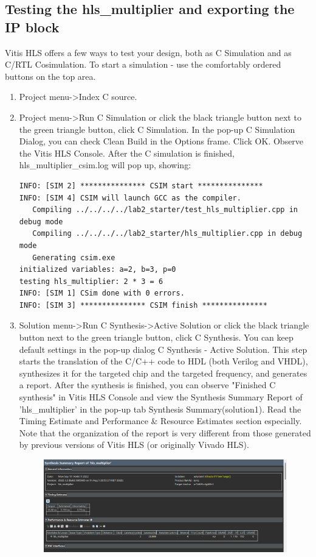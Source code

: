 \documentclass[a4paper,12pt,twoside]{article}
\begin{document}
\subsection{Testing the hls\_multiplier and exporting the IP block}
Vitis HLS offers a few ways to test your design, both as C Simulation and as C/RTL Cosimulation. To start a simulation - use the comfortably ordered buttons on the top area.
\begin{enumerate}
    \item Project menu->Index C source.
    \item Project menu->Run C Simulation or click the black triangle button next to the green triangle button, click C Simulation. In the pop-up C Simulation Dialog, you can check Clean Build in the Options frame. Click OK. Observe the Vitis HLS Console. After the C simulation is finished, hls\_multiplier\_csim.log will pop up, showing:
    \begin{verbatim}
INFO: [SIM 2] *************** CSIM start ***************
INFO: [SIM 4] CSIM will launch GCC as the compiler.
   Compiling ../../../../lab2_starter/test_hls_multiplier.cpp in debug mode
   Compiling ../../../../lab2_starter/hls_multiplier.cpp in debug mode
   Generating csim.exe
initialized variables: a=2, b=3, p=0 
testing hls_multiplier: 2 * 3 = 6 
INFO: [SIM 1] CSim done with 0 errors.
INFO: [SIM 3] *************** CSIM finish ***************
    \end{verbatim}
    \item Solution menu->Run C Synthesis->Active Solution or click the black triangle button next to the green triangle button, click C Synthesis. You can keep default settings in the pop-up dialog C Synthesis - Active Solution. This step starts the translation of the C/C++ code to HDL (both Verilog and VHDL), synthesizes it for the targeted chip and the targeted frequency, and generates a report. After the synthesis is finished, you can observe "Finished C synthesis" in Vitis HLS Console and view the Synthesis Summary Report of 'hls\_multiplier' in the pop-up tab Synthesis Summary(solution1). Read the Timing Estimate and Performance \& Resource Estimates section especially. Note that the organization of the report is very different from those generated by previous versions of Vitis HLS (or originally Vivado HLS).
    \begin{figure}[H]
        \centering
        \includegraphics[width=\textwidth]{images/1.png}

\end{figure}
\end{enumerate}
\end{document}
